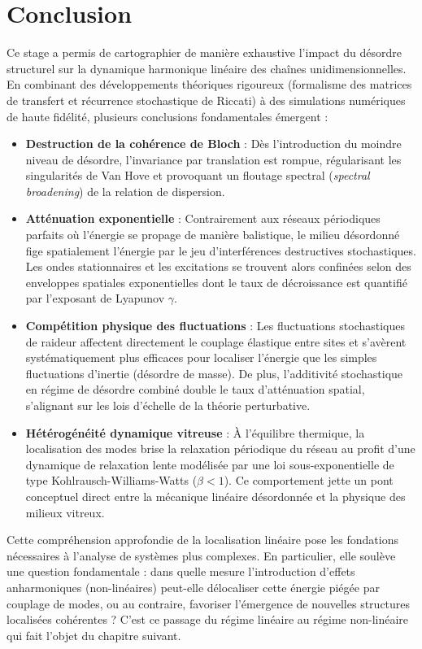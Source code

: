 \chapter*{Conclusion}

Ce stage a permis de cartographier de manière exhaustive l'impact du désordre structurel sur la dynamique harmonique linéaire des chaînes unidimensionnelles. En combinant des développements théoriques rigoureux (formalisme des matrices de transfert et récurrence stochastique de Riccati) à des simulations numériques de haute fidélité, plusieurs conclusions fondamentales émergent :
\begin{itemize}
    \item \textbf{Destruction de la cohérence de Bloch} : Dès l'introduction du moindre niveau de désordre, l'invariance par translation est rompue, régularisant les singularités de Van Hove et provoquant un floutage spectral (\textit{spectral broadening}) de la relation de dispersion.
    \item \textbf{Atténuation exponentielle} : Contrairement aux réseaux périodiques parfaits où l'énergie se propage de manière balistique, le milieu désordonné fige spatialement l'énergie par le jeu d'interférences destructives stochastiques. Les ondes stationnaires et les excitations se trouvent alors confinées selon des enveloppes spatiales exponentielles dont le taux de décroissance est quantifié par l'exposant de Lyapunov $\gamma$.
    \item \textbf{Compétition physique des fluctuations} : Les fluctuations stochastiques de raideur affectent directement le couplage élastique entre sites et s'avèrent systématiquement plus efficaces pour localiser l'énergie que les simples fluctuations d'inertie (désordre de masse). De plus, l'additivité stochastique en régime de désordre combiné double le taux d'atténuation spatial, s'alignant sur les lois d'échelle de la théorie perturbative.
    \item \textbf{Hétérogénéité dynamique vitreuse} : À l'équilibre thermique, la localisation des modes brise la relaxation périodique du réseau au profit d'une dynamique de relaxation lente modélisée par une loi sous-exponentielle de type Kohlrausch-Williams-Watts ($\beta < 1$). Ce comportement jette un pont conceptuel direct entre la mécanique linéaire désordonnée et la physique des milieux vitreux.
\end{itemize}

Cette compréhension approfondie de la localisation linéaire pose les fondations nécessaires à l'analyse de systèmes plus complexes. En particulier, elle soulève une question fondamentale : dans quelle mesure l'introduction d'effets anharmoniques (non-linéaires) peut-elle délocaliser cette énergie piégée par couplage de modes, ou au contraire, favoriser l'émergence de nouvelles structures localisées cohérentes ? C'est ce passage du régime linéaire au régime non-linéaire qui fait l'objet du chapitre suivant.

